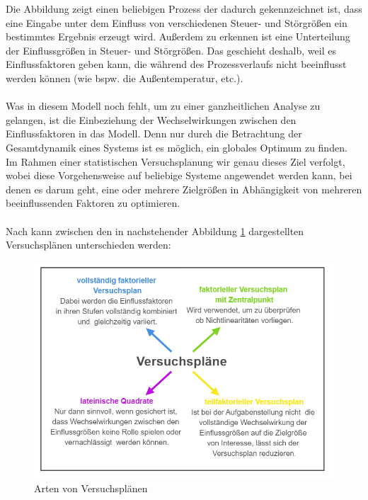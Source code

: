 \documentclass[
fontsize=10pt, 
listof = totoc,
parskip = half	
]{report}
\begin{document}
\noindent Die Abbildung zeigt einen beliebigen Prozess der dadurch gekennzeichnet ist, dass eine Eingabe unter dem Einfluss von verschiedenen Steuer- und Störgrößen ein bestimmtes Ergebnis erzeugt wird. Außerdem zu erkennen ist eine Unterteilung der Einflussgrößen in Steuer- und Störgrößen. Das geschieht deshalb, weil es Einflussfaktoren geben kann, die während des Prozessverlaufs nicht beeinflusst werden können (wie bspw. die Außentemperatur, etc.).
\\\\
\noindent Was in diesem Modell noch fehlt, um zu einer ganzheitlichen Analyse zu gelangen, ist die Einbeziehung der Wechselwirkungen zwischen den Einflussfaktoren in das Modell. Denn nur durch die Betrachtung der Gesamtdynamik eines Systems ist es möglich, ein globales Optimum zu finden. Im Rahmen einer statistischen Versuchsplanung wir genau dieses Ziel verfolgt, wobei diese Vorgehensweise auf beliebige Systeme angewendet werden kann, bei denen es darum geht, eine oder mehrere Zielgrößen in Abhängigkeit von mehreren beeinflussenden Faktoren zu optimieren. 
\\\\
Nach \cite{schiefer_2018} kann zwischen den in nachstehender Abbildung \ref{fig:Versuchsplaene} dargestellten Versuchsplänen unterschieden werden:

\begin{figure}[H]
	\centering
	\includegraphics[scale=0.8]{pics/versuchsplaene}
	\caption{Arten von Versuchsplänen}
	\label{fig:Versuchsplaene}
\end{figure}
\end{document}
